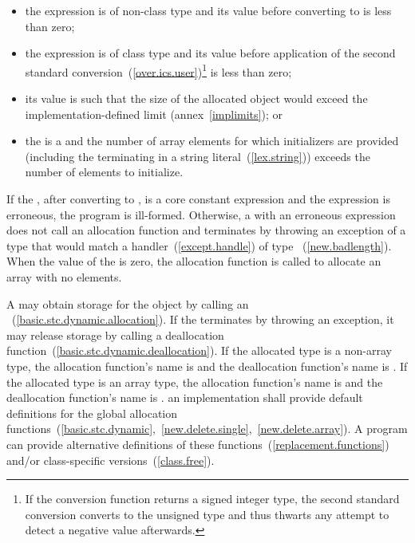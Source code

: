 \begin{itemize}
\item
the expression is of non-class type and its value before converting to
 is less than zero;

\item
the expression is of class type and its value before application of the second
standard conversion~(\ref{over.ics.user})\footnote{If the conversion function
returns a signed integer type, the second standard conversion converts to the
unsigned type  and thus thwarts any attempt to detect a
negative value afterwards.} is less than zero;

\item
its value is such that the size of the allocated object would exceed the
implementation-defined limit (annex~\ref{implimits}); or

\item
the  is a  and the
number of array elements for which initializers are provided (including the
terminating  in a string literal~(\ref{lex.string})) exceeds the
number of elements to initialize.
\end{itemize}

If the , after converting to , is a
core constant expression and the expression is erroneous, the program is
ill-formed. Otherwise, a  with an erroneous
expression does not call an allocation function and terminates by throwing an
exception of a type that would match a handler~(\ref{except.handle}) of type
~(\ref{new.badlength}).
When the value of the  is zero, the allocation
function is called to allocate an array with no elements.

\pnum
A  may obtain storage for the object by calling an
~(\ref{basic.stc.dynamic.allocation}). If
the  terminates by throwing an exception, it
may release storage by calling a deallocation
function~(\ref{basic.stc.dynamic.deallocation}). If the allocated type
is a non-array type, the allocation function's name is
%
%
 and the deallocation function's name is
. If the allocated type is an array type, the
allocation function's name is
%
%
and the deallocation function's name is
.
\enternote 
an implementation shall provide default definitions for the global
allocation
functions~(\ref{basic.stc.dynamic},~\ref{new.delete.single},~\ref{new.delete.array}).
A \Cpp program can provide alternative definitions of
these functions~(\ref{replacement.functions}) and/or class-specific
versions~(\ref{class.free}).
\exitnote 

